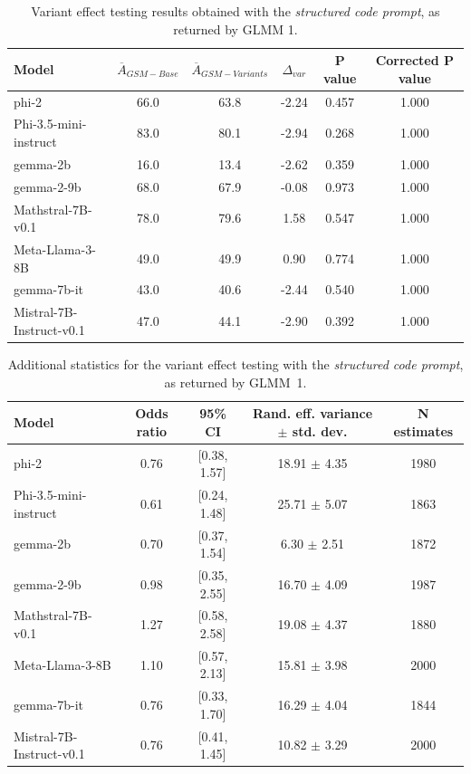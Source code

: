 \documentclass[11pt]{article}
\begin{document}
\begin{table}[H]
\centering
\small
\begin{tabular}{lccccc}
\toprule
Model & $\overline{A}_{GSM-Base}$ & $\overline{A}_{GSM-Variants}$ & $\Delta_{var}$ & P value & Corrected P value \\
\midrule
phi-2 & 66.0 & 63.8 & -2.24 & 0.457 & 1.000 \\
Phi-3.5-mini-instruct & 83.0 & 80.1 & -2.94 & 0.268 & 1.000 \\
gemma-2b & 16.0 & 13.4 & -2.62 & 0.359 & 1.000 \\
gemma-2-9b & 68.0 & 67.9 & -0.08 & 0.973 & 1.000 \\
Mathstral-7B-v0.1 & 78.0 & 79.6 & 1.58 & 0.547 & 1.000 \\
Meta-Llama-3-8B & 49.0 & 49.9 & 0.90 & 0.774 & 1.000 \\
gemma-7b-it & 43.0 & 40.6 & -2.44 & 0.540 & 1.000 \\
Mistral-7B-Instruct-v0.1 & 47.0 & 44.1 & -2.90 & 0.392 & 1.000 \\
\bottomrule
\end{tabular}
\caption{Variant effect testing results obtained with the \textit{structured code prompt}, as returned by GLMM 1.}
\label{tab:code-long-results}
\end{table}

\begin{table}[H]
\centering
\small
\begin{tabular}{lcccc}
\toprule
Model & Odds ratio & 95\% CI & Rand. eff. variance $\pm$ std. dev. & N estimates \\
\midrule
phi-2 & 0.76 & [0.38, 1.57] & 18.91 $\pm$ 4.35 & 1980 \\
Phi-3.5-mini-instruct & 0.61 & [0.24, 1.48] & 25.71 $\pm$ 5.07 & 1863 \\
gemma-2b & 0.70 & [0.37, 1.54] & 6.30 $\pm$ 2.51 & 1872 \\
gemma-2-9b & 0.98 & [0.35, 2.55] & 16.70 $\pm$ 4.09 & 1987 \\
Mathstral-7B-v0.1 & 1.27 & [0.58, 2.58] & 19.08 $\pm$ 4.37 & 1880 \\
Meta-Llama-3-8B & 1.10 & [0.57, 2.13] & 15.81 $\pm$ 3.98 & 2000 \\
gemma-7b-it & 0.76 & [0.33, 1.70] & 16.29 $\pm$ 4.04 & 1844 \\
Mistral-7B-Instruct-v0.1 & 0.76 & [0.41, 1.45] & 10.82 $\pm$ 3.29 & 2000 \\
\bottomrule
\end{tabular}
\caption{Additional statistics for the variant effect testing with the \textit{structured code prompt}, as returned by GLMM~1.}
\label{tab:code-long-stats}
\end{table}
\end{document}

